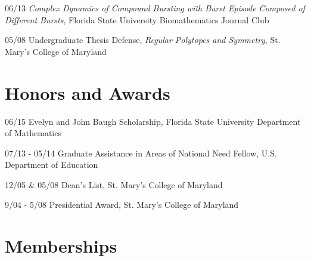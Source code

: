 \documentclass[a4paper]{article}
\begin{document}
\begin{CV}
\item[06/13] {\it Complex Dynamics of Compound Bursting with Burst Episode Composed of Different Bursts}, Florida State University Biomathematics Journal Club
\item[05/08] Undergraduate Thesis Defense, {\it Regular Polytopes and Symmetry}, St. Mary's College of Maryland
\end{CV}

\section{Honors and Awards}
\begin{CV}
\item[06/15] Evelyn and John Baugh Scholarship, Florida State University Department of Mathematics
\item[07/13 - 05/14] Graduate Assistance in Areas of National Need Fellow, U.S. Department of Education
\item[12/05 \& 05/08] Dean's List,  St. Mary's College of Maryland
\item[9/04 - 5/08] Presidential Award,  St. Mary's College of Maryland
\end{CV}

\section{Memberships}
\end{document}
